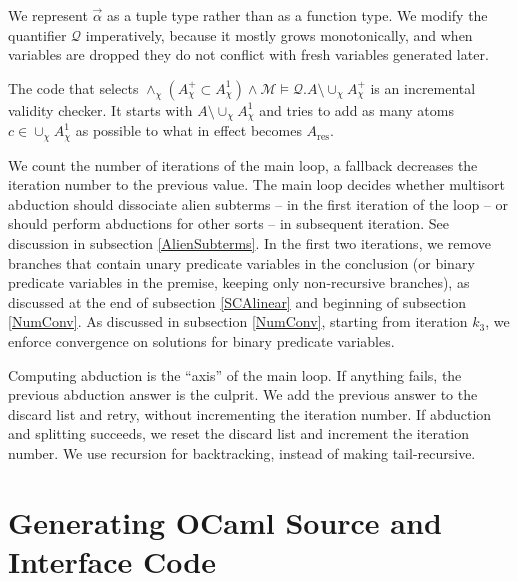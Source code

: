 \documentclass{article}
\newcommand{\tmop}[1]{\ensuremath{\operatorname{#1}}}
\newcommand{\tmverbatim}[1]{{\ttfamily{#1}}}
\begin{document}
We represent $\vec{\alpha}$ as a tuple type rather than as a function type. We
modify the quantifier $\mathcal{Q}$ imperatively, because it mostly grows
monotonically, and when variables are dropped they do not conflict with fresh
variables generated later.

The code that selects $\wedge_{\chi} (A_{\chi}^+ \subset A_{\chi}^1) \wedge
\mathcal{M} \vDash \mathcal{Q}.A \setminus \cup_{\chi} A_{\chi}^+$ is an
incremental validity checker. It starts with $A \setminus \cup_{\chi}
A_{\chi}^1$ and tries to add as many atoms $c \in \cup_{\chi} A_{\chi}^1$ as
possible to what in effect becomes $A_{\tmop{res}}$.

We count the number of iterations of the main loop, a fallback decreases the
iteration number to the previous value. The main loop decides whether
multisort abduction should dissociate alien subterms -- in the first iteration
of the loop -- or should perform abductions for other sorts -- in subsequent
iteration. See discussion in subsection \ref{AlienSubterms}. In the first two
iterations, we remove branches that contain unary predicate variables in the
conclusion (or binary predicate variables in the premise, keeping only
non-recursive branches), as discussed at the end of subsection \ref{SCAlinear}
and beginning of subsection \ref{NumConv}. As discussed in subsection
\ref{NumConv}, starting from iteration $k_3$, we enforce convergence on
solutions for binary predicate variables.

Computing abduction is the ``axis'' of the main loop. If anything fails, the
previous abduction answer is the culprit. We add the previous answer to the
discard list and retry, without incrementing the iteration number. If
abduction and splitting succeeds, we reset the discard list and increment the
iteration number. We use recursion for backtracking, instead of making
\tmverbatim{loop} tail-recursive.

\section{Generating OCaml Source and Interface Code}
\end{document}
